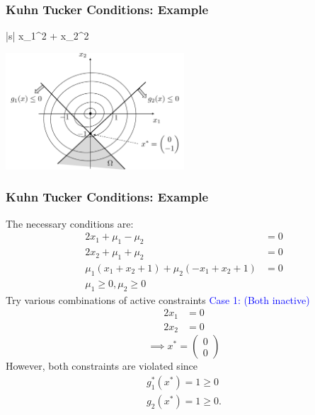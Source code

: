 \documentclass{beamer}
\begin{document}
\begin{frame}\frametitle{Kuhn Tucker Conditions: Example }
	\begin{mini*}|s|
		{}{x_1^2 + x_2^2}{}{}
	\end{mini*}

	\begin{center}
		\includegraphics[width=0.5\textwidth]
			{figures/chap18_example2}
	\end{center}
\end{frame}

\begin{frame}\frametitle{Kuhn Tucker Conditions: Example }
	The necessary conditions are:
	\begin{align*}
		2x_1 + \mu_1 - \mu_2 &= 0\\
		2x_2 + \mu_1 + \mu_2 &= 0\\
		\mu_1(x_1 + x_2 + 1) + \mu_2(-x_1 + x_2 + 1) &= 0\\
		\mu_1 \geq 0, \mu_2 \geq 0
	\end{align*}	
	Try various combinations of active constraints
	\textcolor{blue}{Case 1: (Both inactive) }
	\begin{align*}
		2x_1 &= 0\\
		2x_2 &= 0
	\end{align*}
	\[ \implies x^{\ast} = \begin{pmatrix}
	    0\\0
	  \end{pmatrix}
	\]
	However, both constraints are violated since
	\begin{align*}
		g_1^{\ast}(x^{\ast}) = 1 \geq 0\\
		g_2(x^{\ast}) = 1 \geq 0.
	\end{align*}
\end{frame}
	
\end{document}

